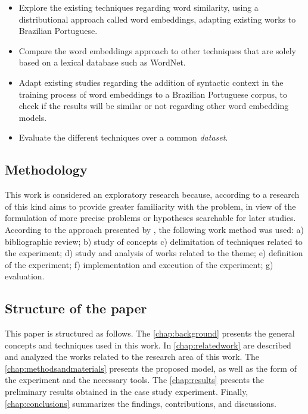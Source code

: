 \begin{itemize}
    \item Explore the existing techniques regarding word similarity, using a distributional approach called word embeddings, adapting existing works to Brazilian Portuguese.
    \item Compare the word embeddings approach to other techniques that are solely based on a lexical database such as WordNet.
    \item Adapt existing studies regarding the addition of syntactic context in the training process of word embeddings to a Brazilian Portuguese corpus, to check if the results will be similar or not regarding other word embedding models. 
    \item Evaluate the different techniques over a common \textit{dataset}.
\end{itemize}


\subsection{Methodology}

This work is considered an exploratory research because, according to  a research of this kind aims to provide greater familiarity with the problem, in view of the formulation of more precise problems or hypotheses searchable for later studies.
According to the approach presented by , the following work method was used: a) bibliographic review; b) study of concepts c) delimitation of techniques related to the experiment; d) study and analysis of works related to the theme; e) definition of the experiment; f) implementation and execution of the experiment; g) evaluation.

\subsection{Structure of the paper}

This paper is structured as follows. The \autoref{chap:background} presents the general concepts and techniques used in this work. In \autoref{chap:relatedwork} are described and analyzed the works related to the research area of this work. The \autoref{chap:methodsandmaterials} presents the proposed model, as well as the form of the experiment and the necessary tools. 
The \autoref{chap:results} presents the preliminary results obtained in the case study experiment. 
Finally, \autoref{chap:conclusions} summarizes the findings, contributions, and discussions.



